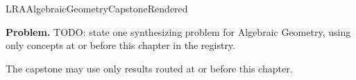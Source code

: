 \ifcsname LRAAlgebraicGeometryCapstoneRendered\endcsname
\else
\expandafter\gdef\csname LRAAlgebraicGeometryCapstoneRendered\endcsname{}

\newpage
{}
\label{cap:algebraic-geometry}

\begin{tcolorbox}[
  colback=gray!6,
  colframe=gray!40,
  arc=2pt,
  left=8pt, right=8pt, top=6pt, bottom=6pt,
  title={\small\textbf{Capstone Problem}},
  fonttitle=\small\bfseries
]
\textbf{Problem.}
TODO: state one synthesizing problem for Algebraic Geometry, using only concepts at or
before this chapter in the registry.
\end{tcolorbox}

\begin{remark*}
The capstone may use only results routed at or before this chapter.
\end{remark*}

\clearpage
\fi
